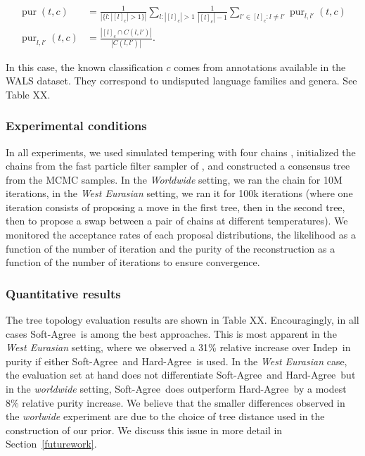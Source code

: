 \documentclass {article}
\newcommand\eqclass[2]{[#1]_{#2}}
\DeclareMathOperator{\purity}{pur}
\newcommand\softagree{{\sc Soft-Agree}}
\newcommand\hardagree{{\sc Hard-Agree}}
\newcommand\indep{{\sc Indep}}
\begin{document}
\begin{align*} 
\purity(t,c) &= \frac{1}{|\{l:|\eqclass{l}{c}|>1\}|} \sum_{l:|\eqclass{l}{c}|>1} \frac{1}{|\eqclass{l}{c}| -1} \sum_{l'\in\eqclass{l}{c}:l\neq l'} \purity_{l,l'}(t,c) \\
\purity_{l,l'}(t,c) &= \frac{|\eqclass{l}{c} \cap C(l,l')|}{|C(l,l')|}.
\end{align*}

In this case, the known classification $c$ comes from annotations available in the WALS dataset.  They correspond to undisputed language families and genera.  See Table XX.

\subsubsection*{Experimental conditions}

In all experiments, we used simulated tempering with four chains \cite{xx}, initialized the chains from the fast particle filter sampler of \cite{xxx}, and constructed a consensus tree from the MCMC samples.
In the \emph{Worldwide} setting, we ran the chain for 10M iterations, in the \emph{West Eurasian} setting, we ran it for 100k iterations (where one iteration consists of proposing a move in the first tree, then in the second tree, then to propose a swap between a pair of chains at different temperatures).  We monitored the acceptance rates of each proposal distributions, the likelihood as a function of the number of iteration and the purity of the reconstruction as a function of the number of iterations to ensure convergence.

\subsubsection*{Quantitative results}

The tree topology evaluation results are shown in Table XX. Encouragingly, in all cases \softagree\ is among the best approaches.  This is most apparent in the \emph{West Eurasian} setting, where we observed a 31\% relative increase over \indep\ in purity if either \softagree\ and \hardagree\ is used.  In the \emph{West Eurasian} case, the evaluation set at hand does not differentiate \softagree\ and \hardagree\, but in the \emph{worldwide} setting, \softagree\ does outperform \hardagree\ by a modest 8\% relative purity increase.  We believe that the smaller differences observed in the \emph{worlwide} experiment are due to the choice of tree distance used in the construction of our prior.  We discuss this issue in more detail in Section~\ref{futurework}.
\end{document}
